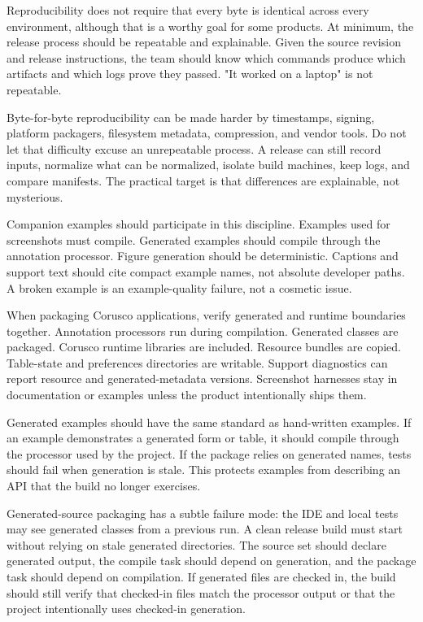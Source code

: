 Reproducibility does not require that every byte is identical across every environment, although that is a worthy goal for some products. At minimum, the release process should be repeatable and explainable. Given the source revision and release instructions, the team should know which commands produce which artifacts and which logs prove they passed. "It worked on a laptop" is not repeatable.

Byte-for-byte reproducibility can be made harder by timestamps, signing, platform packagers, filesystem metadata, compression, and vendor tools. Do not let that difficulty excuse an unrepeatable process. A release can still record inputs, normalize what can be normalized, isolate build machines, keep logs, and compare manifests. The practical target is that differences are explainable, not mysterious.

Companion examples should participate in this discipline. Examples used for screenshots must compile. Generated examples should compile through the annotation processor. Figure generation should be deterministic. Captions and support text should cite compact example names, not absolute developer paths. A broken example is an example-quality failure, not a cosmetic issue.

When packaging Corusco applications, verify generated and runtime boundaries together. Annotation processors run during compilation. Generated classes are packaged. Corusco runtime libraries are included. Resource bundles are copied. Table-state and preferences directories are writable. Support diagnostics can report resource and generated-metadata versions. Screenshot harnesses stay in documentation or examples unless the product intentionally ships them.

Generated examples should have the same standard as hand-written examples. If an example demonstrates a generated form or table, it should compile through the processor used by the project. If the package relies on generated names, tests should fail when generation is stale. This protects examples from describing an API that the build no longer exercises.

Generated-source packaging has a subtle failure mode: the IDE and local tests may see generated classes from a previous run. A clean release build must start without relying on stale generated directories. The source set should declare generated output, the compile task should depend on generation, and the package task should depend on compilation. If generated files are checked in, the build should still verify that checked-in files match the processor output or that the project intentionally uses checked-in generation.

